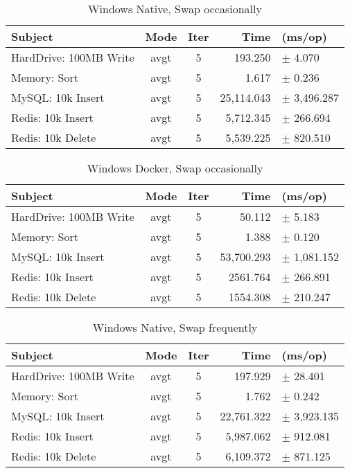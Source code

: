 \documentclass{IEEEtran}
\begin{document}
\begin{table*}
    \centering
    \label{tab:windows-native}
    \caption{Windows Native, Swap occasionally}
    \begin{tabular}{l c c r l}
        \hline
        \textbf{Subject} & \textbf{Mode} & \textbf{Iter} & \textbf{Time} & \textbf{(ms/op)} \\
        \hline
        HardDrive: 100MB Write & avgt & 5 & 193.250 &$\pm$ 4.070 \\
        Memory: Sort      & avgt & 5 & 1.617 &$\pm$ 0.236 \\
        MySQL: 10k Insert & avgt & 5 & 25,114.043 &$\pm$ 3,496.287 \\
        Redis: 10k Insert & avgt & 5 & 5,712.345 &$\pm$ 266.694 \\
        Redis: 10k Delete & avgt & 5 & 5,539.225 &$\pm$ 820.510 \\
    \end{tabular}
\end{table*}

\begin{table*}
    \centering
    \label{tab:windows-docker}
    \caption{Windows Docker, Swap occasionally}
    \begin{tabular}{l c c r l}
        \hline
        \textbf{Subject} & \textbf{Mode} & \textbf{Iter} & \textbf{Time} & \textbf{(ms/op)} \\
        \hline
        HardDrive: 100MB Write & avgt & 5 & 50.112 &$\pm$ 5.183 \\
        Memory: Sort      & avgt & 5 & 1.388 &$\pm$ 0.120 \\
        MySQL: 10k Insert & avgt & 5 & 53,700.293 &$\pm$ 1,081.152 \\
        Redis: 10k Insert & avgt & 5 & 2561.764 &$\pm$ 266.891 \\
        Redis: 10k Delete & avgt & 5 & 1554.308 &$\pm$ 210.247 \\
    \end{tabular}
\end{table*}

\begin{table*}
    \centering
    \label{tab:windows-native-swap}
    \caption{Windows Native, Swap frequently}
    \begin{tabular}{l c c r l}
        \hline
        \textbf{Subject} & \textbf{Mode} & \textbf{Iter} & \textbf{Time} & \textbf{(ms/op)} \\
        \hline
        HardDrive: 100MB Write & avgt & 5 & 197.929 &$\pm$ 28.401 \\
        Memory: Sort      & avgt & 5 & 1.762 &$\pm$ 0.242 \\
        MySQL: 10k Insert & avgt & 5 & 22,761.322 &$\pm$ 3,923.135 \\
        Redis: 10k Insert & avgt & 5 & 5,987.062 &$\pm$ 912.081 \\
        Redis: 10k Delete & avgt & 5 & 6,109.372 &$\pm$ 871.125 \\
    \end{tabular}
\end{table*}
\end{document}
